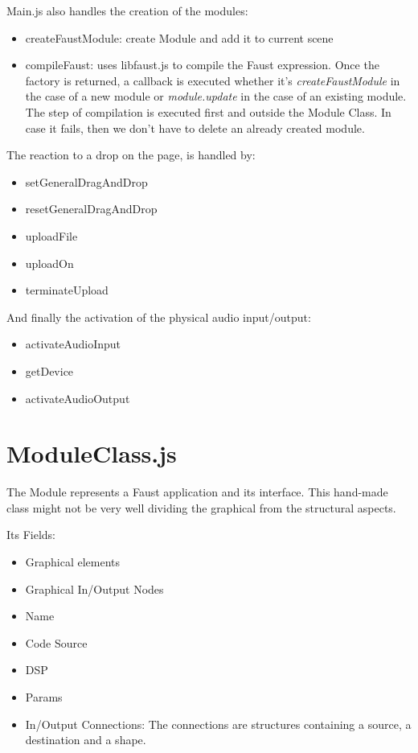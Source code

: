 \documentclass[a4paper]{article}
\begin{document}
Main.js also handles the creation of the modules:
 \begin{itemize}
 \item createFaustModule: create Module and add it to current scene
 \item compileFaust: uses libfaust.js to compile the Faust expression. Once the factory is returned, a callback is executed whether it's {\it createFaustModule} in the case of a new module or {\it module.update} in the case of an existing module. \\
 
 The step of compilation is executed first and outside the Module Class. In case it fails, then we don't have to delete an already created module.
\end{itemize}

The reaction to a drop on the page, is handled by:
 \begin{itemize}
 \item setGeneralDragAndDrop
 \item resetGeneralDragAndDrop
 \item uploadFile
 \item uploadOn
 \item terminateUpload
\end{itemize}

And finally the activation of the physical audio input/output:
 \begin{itemize}
 \item activateAudioInput
 \item getDevice
 \item activateAudioOutput
 \end{itemize}

\section{ModuleClass.js}

The Module represents a Faust application and its interface. 
This hand-made class might not be very well dividing the graphical from the structural aspects. 

Its Fields:
\begin{itemize}
\item Graphical elements
\item Graphical In/Output Nodes 
\item Name
\item Code Source
\item DSP
\item Params
\item In/Output Connections: The connections are structures containing a source, a destination and a shape.
\end{itemize}
\end{document}
